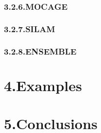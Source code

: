 \documentclass[9pt]{report}
\begin{document}
\subsubsection{3.2.6.\hspace*{0.5em}MOCAGE}\label{sec-mocage}%

\subsubsection{3.2.7.\hspace*{0.5em}SILAM}\label{sec-silam}%

\subsubsection{3.2.8.\hspace*{0.5em}ENSEMBLE}\label{sec-ensemble}%

\section{4.\hspace*{0.5em}Examples}\label{sec-examples}%

\section{5.\hspace*{0.5em}Conclusions}\label{sec-conclusions}%
\end{document}
